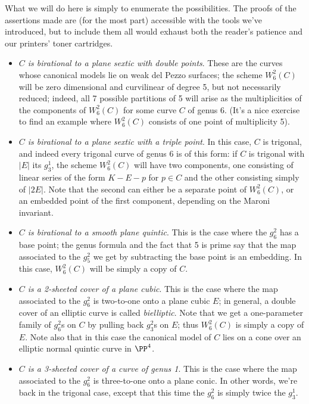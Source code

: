 What we will do here is simply to enumerate the possibilities. The proofs of the assertions made are (for the most part) accessible with the tools we've introduced, but to include them all would exhaust both the reader's patience and our printers' toner cartridges. 

\begin{itemize}

\item \emph{$C$ is birational to a plane sextic with double points}. These are the curves whose canonical models lie on weak del Pezzo surfaces; the scheme $W^2_6(C)$ will be zero dimensional and curvilinear of degree 5, but not necessarily reduced; indeed, all 7 possible partitions of 5 will arise as the multiplicities of the components of $W^2_6(C)$ for some curve $C$ of genus 6. (It's a nice exercise to find an example where $W^2_6(C)$ consists of one point of multiplicity 5). 

\item \emph{$C$ is birational to a plane sextic with a triple point}. In this case, $C$ is trigonal, and indeed every trigonal curve of genus 6 is of this form: if $C$ is trigonal with $|E|$ its $g^1_3$, the scheme $W^2_6(C)$ will have two components, one consisting of linear series of the form $K - E - p$ for $p \in C$ and the other consisting simply of $|2E|$. Note that the second can either be a separate point of $W^2_6(C)$, or an embedded point of the first component, depending on the Maroni invariant.

\item \emph{$C$ is birational to a smooth plane quintic}. This is the case where the $g^2_6$ has a base point; the genus formula and the fact that 5 is prime say that the map associated to the $g^2_5$ we get by subtracting the base point is an embedding. In this case, $W^2_6(C)$ will be simply a copy of $C$.

\item \emph{$C$ is a 2-sheeted cover of a plane cubic}. This is the case where the map associated to the $g^2_6$ is two-to-one onto a plane cubic $E$; in general, a double cover of an elliptic curve is called \emph{bielliptic}. Note that we get a one-parameter family of $g^2_6$s on $C$ by pulling back $g^2_3$s on $E$; thus $W^2_6(C)$ is simply a copy of $E$. Note also that in this case the canonical model of $C$ lies on a cone over an elliptic normal quintic curve in $\PP^4$.

\item \emph{$C$ is a 3-sheeted cover of a curve of genus 1}. This is the case where the map associated to the $g^2_6$ is three-to-one onto a plane conic. In other words, we're back in the trigonal case, except that this time the $g^2_6$ is simply twice the $g^1_3$.
\end{itemize}


